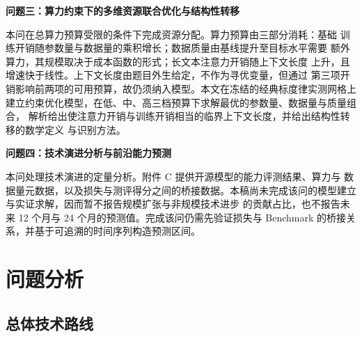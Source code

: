\documentclass[bwprint]{gmcmthesis}
\numberwithin{equation}{section}
\numberwithin{figure}{section}
\numberwithin{table}{section}
\begin{document}
\textbf{问题三：算力约束下的多维资源联合优化与结构性转移}

本问在总算力预算受限的条件下完成资源分配。算力预算由三部分消耗：基础
训练开销随参数量与数据量的乘积增长；数据质量由基线提升至目标水平需要
额外算力，其规模取决于成本函数的形式；长文本注意力开销随上下文长度
上升，且增速快于线性。上下文长度由题目外生给定，不作为寻优变量，但通过
第三项开销影响前两项的可用预算，故仍须纳入模型。本文在冻结的经典标度律实测网格上
建立约束优化模型，在低、中、高三档预算下求解最优的参数量、数据量与质量组合，
解析给出使注意力开销与训练开销相当的临界上下文长度，并给出结构性转移的数学定义
与识别方法。

\textbf{问题四：技术演进分析与前沿能力预测}

本问处理技术演进的定量分析。附件 C 提供开源模型的能力评测结果、算力与
数据量元数据，以及损失与测评得分之间的桥接数据。本稿尚未完成该问的模型建立与实证求解，因而暂不报告规模扩张与非规模技术进步
的贡献占比，也不报告未来 12 个月与 24 个月的预测值。完成该问仍需先验证损失与
Benchmark 的桥接关系，并基于可追溯的时间序列构造预测区间。


\section{问题分析}

%
%

\subsection{总体技术路线}

\end{document}
